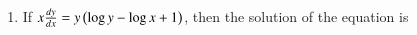 \documentclass[journal]{IEEEtran}
\begin{document}
\begin{enumerate}
	\item If $x\frac{dy}{dx}=y\left(\log y - \log x +1\right)$, then the solution of the equation is
		\hfill{}
		\begin{enumerate}
		\end{enumerate}
\end{enumerate}
\end{document}
